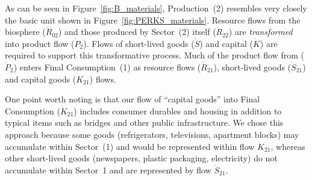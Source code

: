 As can be seen in Figure~\ref{fig:B_materials}, 
Production~(2) resembles very closely the basic unit
shown in Figure~\ref{fig:PERKS_materials}. 
Resource flows from the biosphere ($\dot{R}_{02}$)
and those produced by Sector~(2) itself ($\dot{R}_{22}$) 
are \emph{transformed} into product flow
($\dot{P}_{2}$). 
Flows of short-lived goods ($\dot{S}$) 
and capital ($\dot{K}$) are required to
support this transformative process. 
Much of the product flow from ($\dot{P}_{2}$) 
enters Final Consumption~(1) as 
resource flows ($\dot{R}_{21}$), 
short-lived goods ($\dot{S}_{21}$) 
and capital goods ($\dot{K}_{21}$)
flows.

One point worth noting is that 
our flow of 
``capital goods''
into Final Consumption ($\dot{K}_{21}$) 
includes consumer durables and housing
in addition to typical items 
such as bridges and other public infrastructure.
We chose this approach because some goods 
(refrigerators, televisions, apartment blocks) 
may accumulate within Sector~(1)
and would be represented within flow 
$\dot{K}_{21}$, 
whereas other short-lived goods
(newspapers, plastic packaging, electricity) 
do not accumulate within Sector~1 and are represented by flow 
$\dot{S}_{21}$.


